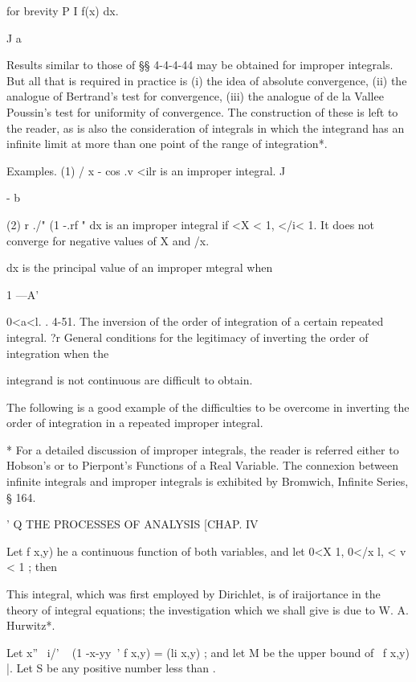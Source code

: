 for brevity P I f(x) dx. 

J a 

Results similar to those of §§ 4-4-4-44 may be obtained for improper 
integrals. But all that is required in practice is (i) the idea of absolute 
convergence, (ii) the analogue of Bertrand's test for convergence, (iii) the 
analogue of de la Vallee Poussin's test for uniformity of convergence. The 
construction of these is left to the reader, as is also the consideration 
of integrals in which the integrand has an infinite limit at more than one 
point of the range of integration*. 



Examples. (1) / x - cos .v <ilr is an improper integral. 
J 



- b 



(2) r ./"  (1 -.rf "  dx is an improper integral if <X < 1, </i< 1. 
It does not converge for negative values of X and /x. 

dx is the principal value of an improper mtegral when 

1 —A' 

0<a<l. 
.   4-51. The inversion of the order of integration of a certain repeated integral. 
?r General conditions for the legitimacy of inverting the order of integration when the 

integrand is not continuous are difficult to obtain. 

The following is a good example of the difficulties to be overcome in inverting the 
order of integration in a repeated improper integral. 

* For a detailed discussion of improper integrals, the reader is referred either to Hobson's or 
to Pierpont's Functions of a Real Variable. The connexion between infinite integrals and 
improper integrals is exhibited by Bromwich, Infinite Series, § 164. 



' Q THE PROCESSES OF ANALYSIS [CHAP. IV 

Let f x,y) he a continuous function of both variables, and let 0<X 1, 0</x l, 
< v < 1 ; then 



This integral, which was first employed by Dirichlet, is of iraijortance in the theory of 
integral equations; the investigation which we shall give is due to W. A. Hurwitz*. 

Let x''~ i/' ~  (1 -x-yy~' f x,y) = (li x,y) ; and let M be the upper bound of \ f x,y) |. 
Let S be any positive number less than .  

